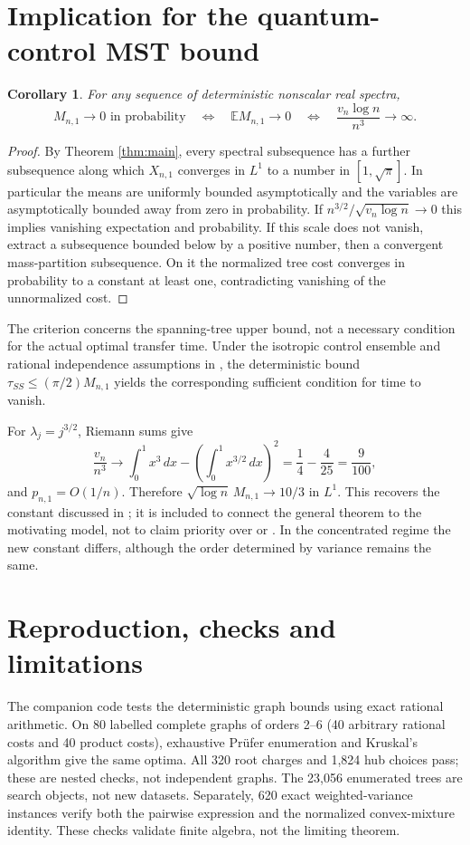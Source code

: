 \documentclass[11pt]{article}
\newtheorem{corollary}[theorem]{Corollary}
\newcommand{\E}{\mathbb E}
\begin{document}
\section{Implication for the quantum-control MST bound}
\begin{corollary}
For any sequence of deterministic nonscalar real spectra,
\[
 M_{n,1}\to0\text{ in probability}\quad\Longleftrightarrow\quad
 \E M_{n,1}\to0\quad\Longleftrightarrow\quad \frac{v_n\log n}{n^3}\to\infty.
\]
\end{corollary}
\begin{proof}
By Theorem \ref{thm:main}, every spectral subsequence has a further subsequence along which $X_{n,1}$ converges in $L^1$ to a number in $[1,\sqrt\pi]$. In particular the means are uniformly bounded asymptotically and the variables are asymptotically bounded away from zero in probability. If $n^{3/2}/\sqrt{v_n\log n}\to0$ this implies vanishing expectation and probability. If this scale does not vanish, extract a subsequence bounded below by a positive number, then a convergent mass-partition subsequence. On it the normalized tree cost converges in probability to a constant at least one, contradicting vanishing of the unnormalized cost.
\end{proof}
The criterion concerns the spanning-tree upper bound, not a necessary condition for the actual optimal transfer time. Under the isotropic control ensemble and rational independence assumptions in \cite{CMcontrol,CMnumerical}, the deterministic bound $\tau_{SS}\le(\pi/2)M_{n,1}$ yields the corresponding sufficient condition for time to vanish.

For $\lambda_j=j^{3/2}$, Riemann sums give
\[
\frac{v_n}{n^3}\to\int_0^1 x^3\,dx-\left(\int_0^1x^{3/2}\,dx\right)^2=\frac14-\frac4{25}=\frac9{100},
\]
and $p_{n,1}=O(1/n)$. Therefore $\sqrt{\log n}\,M_{n,1}\to10/3$ in $L^1$. This recovers the constant discussed in \cite{CMnumerical}; it is included to connect the general theorem to the motivating model, not to claim priority over \cite{Vecer} or \cite{IRSI}. In the concentrated regime the new constant differs, although the order determined by variance remains the same.

\section{Reproduction, checks and limitations}
The companion code tests the deterministic graph bounds using exact rational arithmetic. On 80 labelled complete graphs of orders 2--6 (40 arbitrary rational costs and 40 product costs), exhaustive Pr\"ufer enumeration and Kruskal's algorithm give the same optima. All 320 root charges and 1,824 hub choices pass; these are nested checks, not independent graphs. The 23,056 enumerated trees are search objects, not new datasets. Separately, 620 exact weighted-variance instances verify both the pairwise expression and the normalized convex-mixture identity. These checks validate finite algebra, not the limiting theorem.
\end{document}
